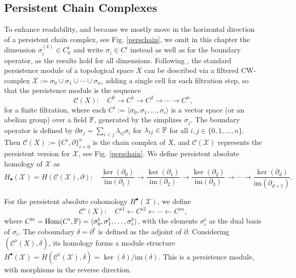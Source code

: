 \subsection{Persistent Chain Complexes}
To enhance readability, and because we mostly move in the horizontal direction of a persistent chain complex, see Fig. \ref{perschain}, we omit in this chapter the dimension $\sigma^{(k)}_i \in C^i_k$ and write $\sigma_i \in C^i$ instead as well as for the boundary operator, as the results hold for all dimensions. Following \cite[\S 2.6]{de2011dualities}, the standard persistence module of a topological space $X$ can be described via a filtered CW-complex $\mathcal{X}:= \sigma_0 \cup \sigma_1 \cup \cdots \cup \sigma_n$, adding a single cell for each filtration step, so that the persistence module is the sequence
\[
	\mathcal{C}(X): \quad C^{0} \to C^{1} \to C^{2} \to \cdots \to C^{n},
\]
for a finite filtration, where each $C^{i} := \langle \sigma_0, \sigma_1, \ldots, \sigma_i \rangle$ is a vector space (or an abelian group) over a field ${\mathbb{F}}$, generated by the simplizes $\sigma_j$. The boundary operator is defined by $\partial \sigma_{j} = \sum_{i<j}\lambda_{ij}\sigma_{i}$ for $\lambda_{ij}\in {\mathbb{F}}$ for all $i, j \in \{0, 1, \ldots, n\}$. Then $\mathcal{C}(X) := \{C^{i},\partial\}_{i=0}^{n}$ is the chain complex of $X$, and $\mathcal{C}(\mathcal{X})$ represents the persistent version for $\mathcal{X}$, see Fig. \ref{perschain}. We define persistent absolute homology of $\mathcal{X}$ as
\[
	H_{\bullet}(\mathcal{X}) = H(\mathcal{C}(\mathcal{X}), \partial): \quad \frac{\ker(\partial_{0})}{\text{im}(\partial_{1})}
	\to \frac{\ker(\partial_{1})}{\text{im}(\partial_{2})} \to \frac{\ker(\partial_{2})}{\text{im}(\partial_{3})}\to \cdots \to \frac{\ker(\partial_{d})}{\text{im}(\partial_{d+1})}
	.
\]

For the persistent absolute cohomology $H^{\bullet}(\mathcal{X})$, we define
\[
	\label{cohomcomplex}
	\mathcal{C}^{\flat}(X): \quad C^{\flat 1} \leftarrow C^{\flat 2} \leftarrow \cdots
	\leftarrow C^{\flat n},
\]
where $C^{\flat i} = \text{Hom}(C^i, {\mathbb{F}}) = \langle \sigma_0^{\flat}, \sigma_1^{\flat}, \ldots, \sigma_i^{\flat} \rangle$, with the elements $\sigma^{\flat}_i$ as the dual basis of $\sigma_i$. The coboundary $\delta= \partial^{\flat}$ is defined as the adjoint of $\partial$. Considering $(\mathcal{C}^{\flat}(X), \delta)$, its homology forms a module structure $H^{\bullet}(\mathcal{X}) = H(\mathcal{C}^{\flat}(\mathcal{X}), \delta) = \ker(\delta) / \text{im}(\delta)$. This is a persistence module, with morphisms in the reverse direction.

